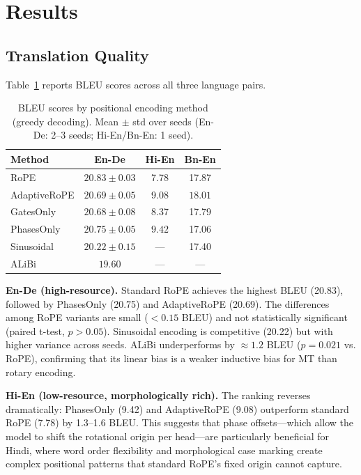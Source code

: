 \documentclass[conference]{IEEEtran}
\begin{document}
\section{Results}
\label{sec:results}

\subsection{Translation Quality}

Table~\ref{tab:main} reports BLEU scores across all three language pairs.

\begin{table}[htbp]
  \caption{BLEU scores by positional encoding method (greedy decoding).
    Mean $\pm$ std over seeds (En-De: 2--3 seeds; Hi-En/Bn-En: 1 seed).}
  \label{tab:main}
  \centering
  \begin{tabular}{lccc}
    \toprule
    \textbf{Method} & \textbf{En-De} & \textbf{Hi-En} & \textbf{Bn-En} \\
    \midrule
    RoPE & $\mathbf{20.83} \pm 0.03$ & 7.78 & 17.87 \\
    AdaptiveRoPE & $20.69 \pm 0.05$ & 9.08 & $\mathbf{18.01}$ \\
    GatesOnly & $20.68 \pm 0.08$ & 8.37 & 17.79 \\
    PhasesOnly & $20.75 \pm 0.05$ & $\mathbf{9.42}$ & 17.06 \\
    Sinusoidal & $20.22 \pm 0.15$ & --- & 17.40 \\
    ALiBi & $19.60$ & --- & --- \\
    \bottomrule
  \end{tabular}
\end{table}

\textbf{En-De (high-resource).} Standard RoPE achieves the highest BLEU
(20.83), followed by PhasesOnly (20.75) and AdaptiveRoPE (20.69). The
differences among RoPE variants are small ($<0.15$ BLEU) and not statistically
significant (paired t-test, $p > 0.05$). Sinusoidal encoding is competitive
(20.22) but with higher variance across seeds. ALiBi underperforms by
$\approx 1.2$ BLEU ($p = 0.021$ vs. RoPE), confirming that its linear bias
is a weaker inductive bias for MT than rotary encoding.

\textbf{Hi-En (low-resource, morphologically rich).} The ranking reverses
dramatically: PhasesOnly (9.42) and AdaptiveRoPE (9.08) outperform standard
RoPE (7.78) by 1.3--1.6 BLEU. This suggests that phase offsets---which allow
the model to shift the rotational origin per head---are particularly beneficial
for Hindi, where word order flexibility and morphological case marking create
complex positional patterns that standard RoPE's fixed origin cannot capture.
\end{document}
